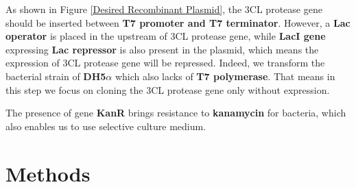 \documentclass{article}
\begin{document}
    As shown in Figure \ref{Desired Recombinant Plasmid}, the 3CL protease gene should be inserted between \textbf{T7 promoter and T7 terminator}.
    However, a \textbf{Lac operator}\cite{TheCell} is placed in the upstream of 3CL protease gene, while \textbf{LacI gene} expressing \textbf{Lac repressor} is also present in the plasmid, which means the expression of 3CL protease gene will be repressed.
    Indeed, we transform the bacterial strain of \textbf{DH5$\alpha$} which also lacks of \textbf{T7 polymerase}.
    That means in this step we focus on cloning the 3CL protease gene only without expression.

    The presence of gene \textbf{KanR} brings resistance to \textbf{kanamycin} for bacteria, which also enables us to use selective culture medium. 
\section{Methods}
\end{document}
